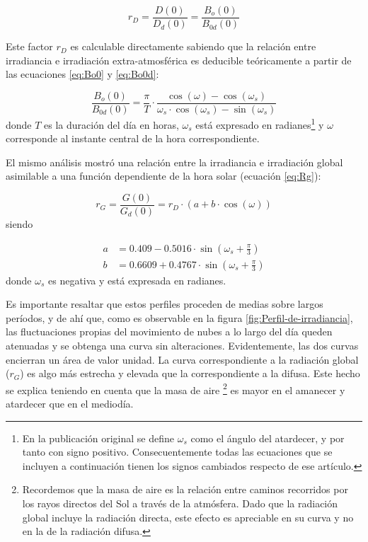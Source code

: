 \begin{equation}
r_{D}=\frac{D(0)}{D_{d}(0)}=\frac{B_{o}(0)}{B_{0d}(0)}\label{eq:Rd}\end{equation}

Este factor $r_{D}$ es calculable directamente sabiendo que la relación
entre irradiancia e irradiación extra-atmosférica es deducible teóricamente
a partir de las ecuaciones \ref{eq:Bo0} y \ref{eq:Bo0d}:

\begin{equation}
  \frac{B_{o}(0)}{B_{0d}(0)}=\frac{\pi}{T}\cdot\frac{\cos(\omega)-\cos(\omega_{s})}{\omega_{s}\cdot\cos(\omega_{s})-\sin(\omega_{s})}\label{eq:RelacionExtraAtmosferica}\end{equation}
donde $T$ es la duración del día en horas, $\omega_s$ está expresado en
radianes\footnote{En la publicación original se define $\omega_s$ como el ángulo del atardecer, y por tanto con signo positivo. Consecuentemente todas las ecuaciones que se incluyen a continuación tienen los signos cambiados respecto de ese artículo.} y $\omega$ corresponde
al instante central de la hora correspondiente.

El mismo análisis mostró una relación entre la irradiancia e irradiación
global asimilable a una función dependiente de la hora solar (ecuación
\ref{eq:Rg}):

\begin{equation}
r_{G}=\frac{G(0)}{G_{d}(0)}=r_{D}\cdot\left(a+b\cdot\cos(\omega)\right)\label{eq:Rg}\end{equation}
siendo

\begin{align}
a & =0.409-0.5016\cdot\sin(\omega_{s}+\frac{\pi}{3})\\
b & =0.6609+0.4767\cdot\sin(\omega_{s}+\frac{\pi}{3})
\end{align}
donde $\omega_s$ es negativa y está expresada en radianes.

Es importante resaltar que estos perfiles proceden de medias sobre
largos períodos, y de ahí que, como es observable en la figura \ref{fig:Perfil-de-irradiancia},
las fluctuaciones propias del movimiento de nubes a lo largo del día
queden atenuadas y se obtenga una curva sin alteraciones. Evidentemente,
las dos curvas encierran un área de valor unidad. La curva correspondiente
a la radiación global ($r_{G}$) es algo más estrecha y elevada que
la correspondiente a la difusa. Este hecho se explica teniendo en
cuenta que la masa de aire%
\footnote{Recordemos que la masa de aire es la relación entre caminos recorridos
por los rayos directos del Sol a través de la atmósfera. Dado que
la radiación global incluye la radiación directa, este efecto es apreciable
en su curva y no en la de la radiación difusa.%
} es mayor en el amanecer y atardecer que en el mediodía.


